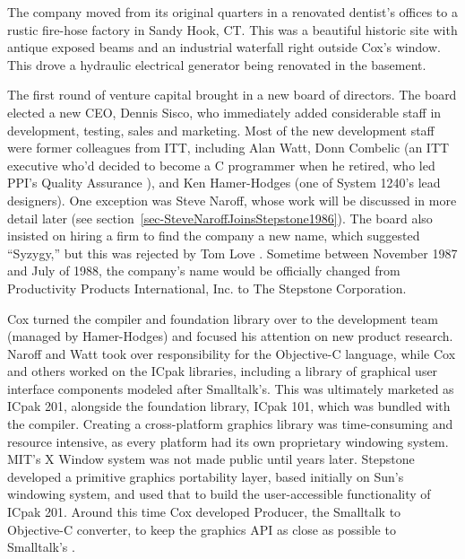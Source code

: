 \documentclass[acmsmall,screen]{acmart}
\begin{document}
The company moved from its original quarters in a renovated dentist's offices to a rustic fire-hose factory in Sandy Hook, CT. This was a beautiful historic site with antique exposed beams and an industrial waterfall right outside Cox's window. This drove a hydraulic electrical generator being renovated in the basement. 

The first round of venture capital brought in a new board of directors. The board elected a new CEO, Dennis Sisco, who immediately added considerable staff in development, testing, sales and marketing. Most of the new development staff were former colleagues from ITT, including Alan Watt, Donn Combelic (an ITT executive who'd decided to become a C programmer when he retired, who led PPI's Quality Assurance \citep[13--14]{love_skype_2019}), and Ken Hamer-Hodges (one of System 1240's lead designers). One exception was Steve Naroff, whose work will be discussed in more detail later (see section~\ref{sec-SteveNaroffJoinsStepstone1986}). The board also insisted on hiring a firm to find the company a new name, which suggested ``Syzygy,'' but this was rejected by Tom Love \citetext{\citeyear[18]{love_skype_2019}}. Sometime between November 1987 and July of 1988, the company's name would be officially changed from Productivity Products International, Inc. to The Stepstone Corporation.

Cox turned the compiler and foundation library over to the development team (managed by Hamer-Hodges) and focused his attention on new product research. Naroff and Watt took over responsibility for the Objective-C language, while Cox and others worked on the ICpak libraries, including a library of graphical user interface components modeled after Smalltalk's. This was ultimately marketed as ICpak 201, alongside the foundation library, ICpak 101, which was bundled with the compiler. Creating a cross-platform graphics library was time-consuming and resource intensive, as every platform had its own proprietary windowing system. MIT's X Window system was not made public until years later. Stepstone developed a primitive graphics portability layer, based initially on Sun's windowing system, and used that to build the user-accessible functionality of ICpak 201. Around this time Cox developed Producer, the Smalltalk to Objective-C converter, to keep the graphics API as close as possible to Smalltalk's  \citep{cox_producer:_1987}.
\end{document}
